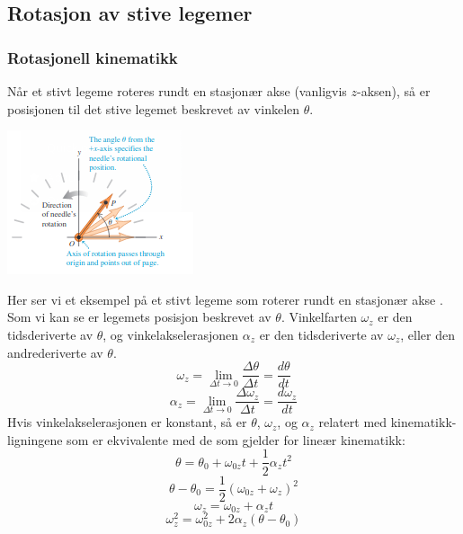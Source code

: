 \graphicspath{ {./bilder/} }

\subsection{Rotasjon av stive legemer}

\subsubsection{Rotasjonell kinematikk}
Når et stivt legeme roteres rundt en stasjonær akse (vanligvis $z$-aksen), så er posisjonen til det stive legemet beskrevet av vinkelen $\theta.$\newline\newline
\begin{center}
\includegraphics{rapport/teori/bilder/theta.png}\newline\newline
\end{center}
Her ser vi et eksempel på et stivt legeme som roterer rundt en stasjonær akse \cite{FYSIKK:1}. Som vi kan se er legemets posisjon beskrevet av $\theta.$\newline\newline
Vinkelfarten $\omega_z$ er den tidsderiverte av $\theta$, og vinkelakselerasjonen $\alpha_z$ er den tidsderiverte av $\omega_z$, eller den andrederiverte av $\theta.$
\begin{equation}
    \omega_z=\lim_{\Delta t\rightarrow0}{\frac{\Delta\theta}{\Delta t}}=\frac{d\theta}{dt}
\end{equation}
\begin{equation}
    \alpha_z=\lim_{\Delta t\rightarrow0}{\frac{\Delta\omega_z}{\Delta t}}=\frac{d\omega_z}{dt}
\end{equation}
Hvis vinkelakselerasjonen er konstant, så er $\theta$, $\omega_z$, og $\alpha_z$ relatert med kinematikk-ligningene som er ekvivalente med de som gjelder for lineær kinematikk:
\begin{equation}
    \theta=\theta_0+\omega_{0z}t+\frac{1}{2}\alpha_zt^2
\end{equation}
\begin{equation}
    \theta-\theta_0=\frac{1}{2}\left(\omega_{0z}+\omega_z\right)^2
\end{equation}
\begin{equation}
    \omega_z=\omega_{0z}+\alpha_zt
\end{equation}
\begin{equation}
    \omega_z^2=\omega_{0z}^2+2\alpha_z(\theta-\theta_0)
\end{equation}


